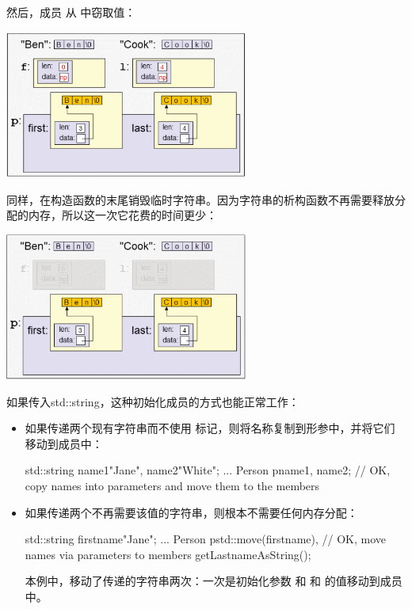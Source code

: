 然后，成员  从  中窃取值：

\begin{center}
	\includegraphics[width=0.6\textwidth]{part1/ch4/images/6}
\end{center}

同样，在构造函数的末尾销毁临时字符串。因为字符串的析构函数不再需要释放分配的内存，所以这一次它花费的时间更少：

\begin{center}
	\includegraphics[width=0.6\textwidth]{part1/ch4/images/7}
\end{center}

如果传入std::string，这种初始化成员的方式也能正常工作：

\begin{itemize}
	\item 如果传递两个现有字符串而不使用  标记，则将名称复制到形参中，并将它们移动到成员中：

	\begin{cppcode}
std::string name1{"Jane"}, name2{"White"};
...
Person p{name1, name2}; // OK, copy names into parameters and move them to the members
	\end{cppcode}
	\item 如果传递两个不再需要该值的字符串，则根本不需要任何内存分配：
	\begin{cppcode}
std::string firstname{"Jane"};
...
Person p{std::move(firstname), // OK, move names via parameters to members
	getLastnameAsString()};
	\end{cppcode}
	本例中，移动了传递的字符串两次：一次是初始化参数  和  和  的值移动到成员中。
\end{itemize}

